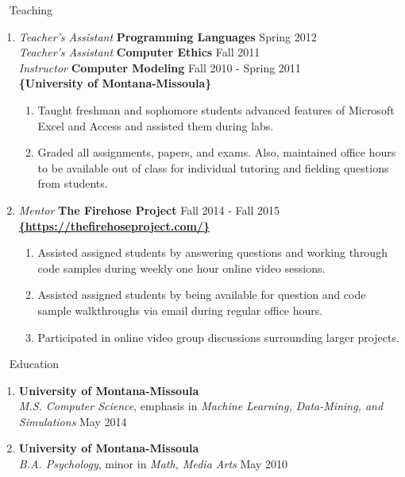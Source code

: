 \documentclass[oneside]{article}%
\begin{document}
\
\newpage
\noindent
\huge{Teaching}
\small
\begin{enumerate}[]
	\item \textit{Teacher's Assistant} \textbf{Programming Languages} \hfill Spring 2012\\
		\textit{Teacher's Assistant} \textbf{Computer Ethics} \hfill Fall 2011\\
		\textit{Instructor} \textbf{Computer Modeling} \hfill Fall 2010 - Spring 2011\\
		\textbf{\{University of Montana-Missoula\}}
		\begin{enumerate}[*]
			\item Taught freshman and sophomore students advanced features of Microsoft Excel and Access and assisted them during labs.
			\item Graded all assignments, papers, and exams. Also, maintained office hours to be available out of class for individual tutoring and fielding questions from students.
		\end{enumerate}
	\item \textit{Mentor} \textbf{The Firehose Project} \hfill Fall 2014 - Fall 2015\\
		\textbf{\href{https://thefirehoseproject.com/}{\{https://thefirehoseproject.com/\}}}
		\begin{enumerate}[*]
			\item Assisted assigned students by answering questions and working through code samples during weekly one hour online video sessions.
			\item Assisted assigned students by being available for question and code sample walkthroughs via email during regular office hours.
			\item Participated in online video group discussions surrounding larger projects.

		\end{enumerate}
\end{enumerate}
\
\noindent
\huge{Education}
\small
\begin{enumerate}[]
\item \textbf{University of Montana-Missoula}\\
	\textit{M.S. Computer Science}, emphasis in \textit{Machine Learning, Data-Mining, and Simulations} \hfill May 2014
\item \textbf{University of Montana-Missoula}\\
	\textit{B.A. Psychology}, minor in \textit{Math, Media Arts} \hfill May 2010
	\
\end{enumerate}
\end{document}
